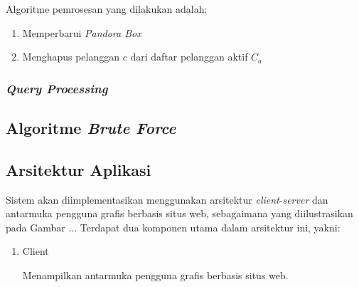 Algoritme pemrosesan yang dilakukan adalah:
\begin{enumerate}
	\item Memperbarui \textit{Pandora Box}
	\item Menghapus pelanggan $c$ dari daftar pelanggan aktif $C_a$
\end{enumerate}

\subsubsection{\textit{Query Processing}}

\subsection{Algoritme \textit{Brute Force}}

\subsection{Arsitektur Aplikasi} 
\tab Sistem akan diimplementasikan menggunakan arsitektur \textit{client}-\textit{server} dan antarmuka pengguna grafis berbasis situs web, sebagaimana yang diilustrasikan pada Gambar ... Terdapat dua komponen utama dalam arsitektur ini, yakni:

\begin{enumerate}
	\item Client
	
	\tab Menampilkan antarmuka pengguna grafis berbasis situs web. 
\end{enumerate}